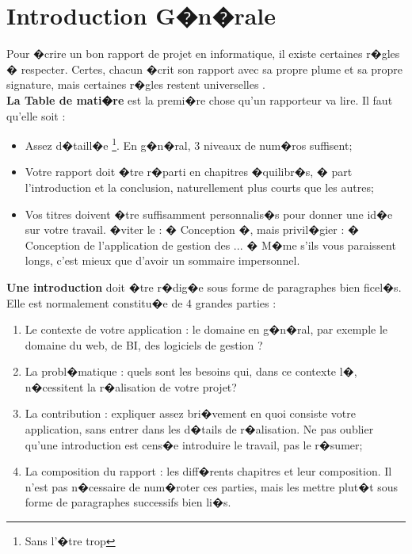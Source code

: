 \chapter*{Introduction G�n�rale}

\begin{spacing}{1.2}

Pour �crire un bon rapport \cite{SFAXI2015} de projet en informatique, il existe certaines r�gles � respecter. Certes, chacun �crit son rapport avec sa propre plume et sa propre signature, mais certaines r�gles restent universelles    \cite{Latex}.\\

\textbf{La Table de mati�re} est la premi�re chose qu'un rapporteur va lire. Il faut qu'elle soit :
\begin{itemize}
\item Assez d�taill�e \footnote{Sans l'�tre trop}. En g�n�ral, 3 niveaux de num�ros suffisent;
\item Votre rapport doit �tre r�parti en chapitres �quilibr�s, � part l'introduction et la conclusion, naturellement plus courts que les autres;
\item Vos titres doivent �tre suffisamment personnalis�s pour donner une id�e sur votre travail. �viter le : � Conception �,  mais privil�gier : � Conception de l'application de gestion des $...$ � M�me s'ils vous paraissent longs, c'est mieux que 
d'avoir un sommaire impersonnel. \\
\end{itemize}

\textbf{Une introduction} doit �tre r�dig�e sous forme de paragraphes bien ficel�s. Elle est
normalement constitu�e de 4 grandes parties :
\begin{enumerate}
\item Le contexte de votre application : le domaine en g�n�ral, par exemple le domaine du web, de BI, des logiciels de gestion ?
\item La probl�matique : quels sont les besoins qui, dans ce contexte l�, n�cessitent la r�alisation de votre projet?
\item La contribution : expliquer assez bri�vement en quoi consiste votre application, sans entrer dans les d�tails de r�alisation. Ne pas oublier qu'une introduction est
 cens�e introduire le travail, pas le r�sumer; 
 \item La composition du rapport : les diff�rents chapitres et leur composition. Il n'est pas n�cessaire de num�roter ces parties, mais les mettre plut�t sous forme de paragraphes successifs bien li�s.
\end{enumerate}






\end{spacing}


